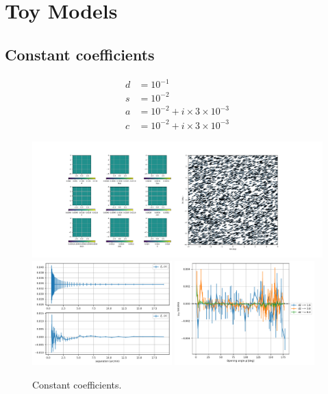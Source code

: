 \newpage
\section{Toy Models} \label{sec:toy_models}

\subsection{Constant coefficients}

\begin{align}
d &= 10^{-1} \\
s &= 10^{-2} \\
a &= 10^{-2} + i \times 3 \times 10^{-3} \\
c &= 10^{-2} + i \times 3 \times 10^{-3}
\end{align}

\begin{figure}[h]
\centering
\includegraphics[width=\textwidth]{figs/20230109_constant/coeff_shear.pdf}
\includegraphics[width=0.48\textwidth]{figs/20230109_constant/2point.pdf}
\includegraphics[width=0.48\textwidth]{figs/20230109_constant/3point.pdf}
\caption{Constant coefficients.}
\label{fig:constant}
\end{figure}

